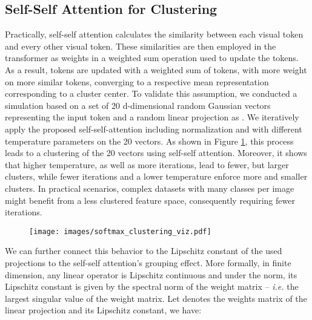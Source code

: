 \documentclass[10pt,twocolumn,letterpaper]{article}
\begin{document}
\subsection{Self-Self Attention for Clustering}\label{subsec:ssa_clustering}
Practically, self-self attention calculates the similarity between each visual token and every other visual token. These similarities are then employed in the transformer as weights in a weighted sum operation used to update the tokens.
As a result, tokens are updated with a weighted sum of tokens, with more weight on more similar tokens, converging to a respective mean representation corresponding to a cluster center.
To validate this assumption, we conducted a simulation based on a set of 20 d-dimensional random Gaussian vectors representing the input token  and a random linear projection as . We iteratively apply the proposed self-self-attention including normalization and with different temperature parameters on the 20 vectors.
As shown in Figure \ref{fig:softmax-clustering}, this process leads to a clustering of the 20 vectors using self-self attention. Moreover, it shows that higher temperature, as well as more iterations, lead to fewer, but larger clusters, while fewer iterations and a lower temperature enforce more and smaller clusters. In practical scenarios, complex datasets with many classes per image might benefit from a less clustered feature space, consequently requiring fewer iterations.

\begin{figure}
\centering
\texttt{[image: images/softmax\_clustering\_viz.pdf]}
\label{fig:softmax-clustering}\vspace{-5mm}
\end{figure}

We can further connect this behavior to the Lipschitz constant of the used projections to the self-self attention's grouping effect.
More formally, in finite dimension, any linear operator is Lipschitz continuous and under the  norm, its Lipschitz constant is given by the spectral norm of the weight matrix -- \textit{i.e.} the largest singular value of the weight matrix.
Let  denotes the weights matrix of the linear projection and  its Lipschitz constant, we have:
\end{document}
